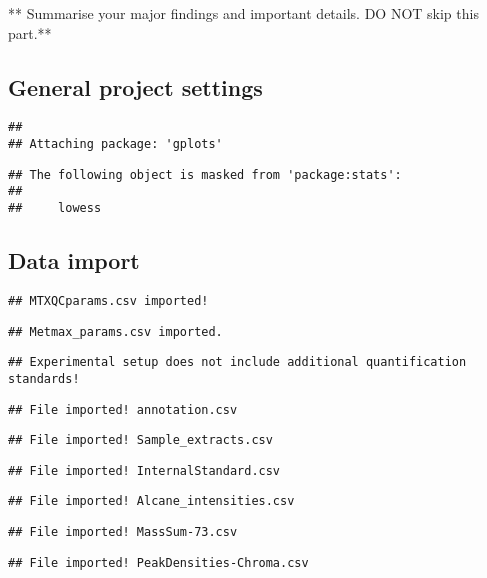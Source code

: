 \documentclass[9pt,]{article}
\begin{document}
** Summarise your major findings and important details. DO NOT skip this
part.**

\subsection{General project settings}\label{general-project-settings}

\begin{verbatim}
## 
## Attaching package: 'gplots'
\end{verbatim}

\begin{verbatim}
## The following object is masked from 'package:stats':
## 
##     lowess
\end{verbatim}

\subsection{Data import}\label{data-import}

\begin{verbatim}
## MTXQCparams.csv imported!
\end{verbatim}

\begin{verbatim}
## Metmax_params.csv imported.
\end{verbatim}

\begin{verbatim}
## Experimental setup does not include additional quantification standards!
\end{verbatim}

\begin{verbatim}
## File imported! annotation.csv
\end{verbatim}

\begin{verbatim}
## File imported! Sample_extracts.csv
\end{verbatim}

\begin{verbatim}
## File imported! InternalStandard.csv
\end{verbatim}

\begin{verbatim}
## File imported! Alcane_intensities.csv
\end{verbatim}

\begin{verbatim}
## File imported! MassSum-73.csv
\end{verbatim}

\begin{verbatim}
## File imported! PeakDensities-Chroma.csv
\end{verbatim}
\end{document}
